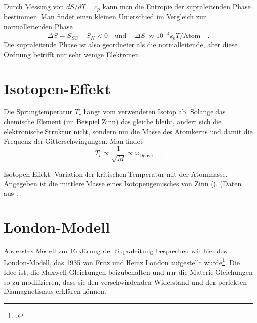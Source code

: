 Durch Messung von $dS/ dT = c_p$ kann man die Entropie der supraleitenden Phase bestimmen. Man findet einen kleinen Unterschied im Vergleich zur normalleitenden Phase
\begin{equation}
    \Delta S = S_{SC} - S_N < 0 \quad \text{und} \quad |\Delta S| \approx 10^{-4} k_b T / \text{Atom}
    \quad .
\end{equation} 
Die supraleitende Phase ist also geordneter als die normalleitende, aber diese Ordnung betrifft nur sehr wenige Elektronen.


\section*{Isotopen-Effekt}

Die Sprungtemperatur $T_c$ hängt vom verwendeten Isotop ab. Solange das chemische Element (im Beispiel Zinn) das gleiche bleibt, ändert sich die elektronische Struktur nicht, sondern nur die Masse des Atomkerns und damit die Frequenz der Gitterschwingungen. Man findet
\begin{equation}
    T_c \propto \frac{1}{\sqrt{M}} \propto \omega_\text{Debye} \quad .
\end{equation}


\begin{marginfigure}
    \caption{Isotopen-Effekt: Variation der kritischen Temperatur mit der Atommasse. Angegeben ist die mittlere Masse eines Isotopengemisches von Zinn (). (Daten aus  \cite{Hunklinger2014}. \label{fig:6_isotopeneffekt}}
\end{marginfigure}


\section*{London-Modell}

Als erstes Modell zur Erklärung der Supraleitung besprechen wir hier das London-Modell, das 1935 von Fritz und Heinz London aufgestellt wurde\footcite{London1935}. Die Idee ist, die Maxwell-Gleichungen beizubehalten und nur die Materie-Gleichungen so zu modifizieren, dass sie den verschwindenden Widerstand und den perfekten Diamagnetismus erklären können.

